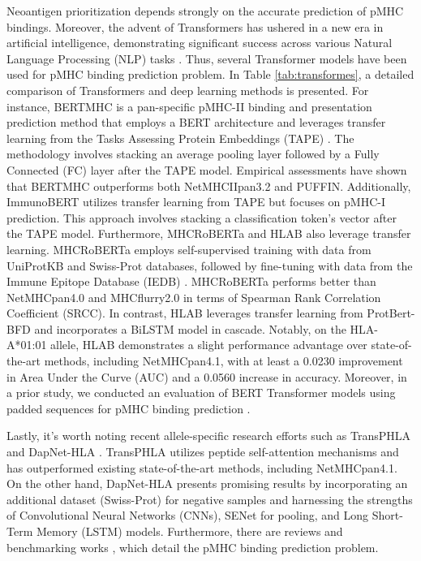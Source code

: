 Neoantigen prioritization depends strongly on the accurate prediction of pMHC bindings. Moreover, the advent of Transformers has ushered in a new era in artificial intelligence, demonstrating significant success across various Natural Language Processing (NLP) tasks \cite{patwardhan2023transformers}. Thus,  several Transformer models have been used for pMHC binding prediction problem. In Table \ref{tab:transformes}, a detailed comparison of Transformers and deep learning methods is presented. For instance, BERTMHC \cite{cheng2021bertmhc} is a pan-specific pMHC-II binding and presentation prediction method that employs a BERT architecture and leverages transfer learning from the Tasks Assessing Protein Embeddings (TAPE) \cite{rao2019evaluating}. The methodology involves stacking an average pooling layer followed by a Fully Connected (FC) layer after the TAPE model. Empirical assessments have shown that BERTMHC outperforms both NetMHCIIpan3.2 and PUFFIN. Additionally, ImmunoBERT \cite{gasser2021interpreting} utilizes transfer learning from TAPE but focuses on pMHC-I prediction. This approach involves stacking a classification token's vector after the TAPE model.
Furthermore, MHCRoBERTa \cite{wang2022mhcroberta} and HLAB \cite{zhang2022hlab} also leverage transfer learning. MHCRoBERTa employs self-supervised training with data from UniProtKB and Swiss-Prot databases, followed by fine-tuning with data from the Immune Epitope Database (IEDB) \cite{vita2019immune}. MHCRoBERTa performs better than NetMHCpan4.0 and MHCflurry2.0 in terms of Spearman Rank Correlation Coefficient (SRCC). In contrast, HLAB leverages transfer learning from ProtBert-BFD \cite{elnaggar2021prottrans} and incorporates a BiLSTM model in cascade. Notably, on the HLA-A*01:01 allele, HLAB demonstrates a slight performance advantage over state-of-the-art methods, including NetMHCpan4.1, with at least a 0.0230 improvement in Area Under the Curve (AUC) and a 0.0560 increase in accuracy. Moreover, in a prior study, we conducted an evaluation of BERT Transformer models using padded sequences for pMHC binding prediction \cite{arceda2023neoantigen}.

Lastly, it's worth noting recent allele-specific research efforts such as TransPHLA \cite{chu2022transformer} and DapNet-HLA \cite{jing2023dapnet}. TransPHLA utilizes peptide self-attention mechanisms and has outperformed existing state-of-the-art methods, including NetMHCpan4.1. %
On the other hand, DapNet-HLA \cite{jing2023dapnet} presents promising results by incorporating an additional dataset (Swiss-Prot) for negative samples and harnessing the strengths of Convolutional Neural Networks (CNNs), SENet for pooling, and Long Short-Term Memory (LSTM) models. %
Furthermore, there are reviews and benchmarking works \cite{nielsen2020immunoinformatics,mei2020comprehensive,wang2023comprehensive, machaca2023deep,wang2023comprehensive}, which detail the pMHC binding prediction problem. 

